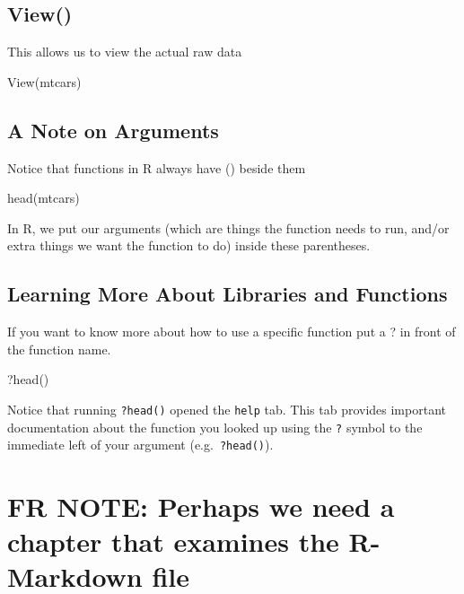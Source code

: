 \documentclass[
]{book}
\newenvironment{Shaded}{\begin{snugshade}}{\end{snugshade}}
\newcommand{\FunctionTok}[1]{\textcolor[rgb]{0.00,0.00,0.00}{#1}}
\newcommand{\NormalTok}[1]{#1}
\begin{document}
\hypertarget{view}{%
\section{View()}\label{view}}

This allows us to view the actual raw data

\begin{Shaded}
\begin{Highlighting}[]
\FunctionTok{View}\NormalTok{(mtcars)}
\end{Highlighting}
\end{Shaded}

\hypertarget{a-note-on-arguments}{%
\section{A Note on Arguments}\label{a-note-on-arguments}}

Notice that functions in R always have () beside them

head(mtcars)

In R, we put our arguments (which are things the function needs to run, and/or extra things we want the function to do) inside these parentheses.

\hypertarget{learning-more-about-libraries-and-functions}{%
\section{Learning More About Libraries and Functions}\label{learning-more-about-libraries-and-functions}}

If you want to know more about how to use a specific function put a ? in front of the function name.

\begin{Shaded}
\begin{Highlighting}[]
\NormalTok{?}\FunctionTok{head}\NormalTok{()}
\end{Highlighting}
\end{Shaded}

Notice that running \texttt{?head()} opened the \texttt{help} tab. This tab provides important documentation about the function you looked up using the \texttt{?} symbol to the immediate left of your argument (e.g.~\texttt{?head()}).

\hypertarget{fr-note-perhaps-we-need-a-chapter-that-examines-the-r-markdown-file}{%
\chapter{FR NOTE: Perhaps we need a chapter that examines the R-Markdown file}\label{fr-note-perhaps-we-need-a-chapter-that-examines-the-r-markdown-file}}
\end{document}
